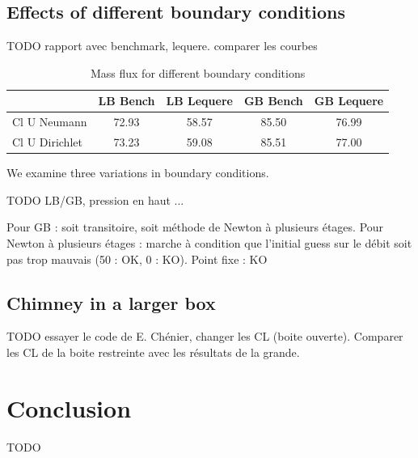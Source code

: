 \documentclass[12pt]{article}
\begin{document}
\subsection{Effects of different boundary conditions}
TODO rapport avec benchmark, lequere. comparer les courbes
\begin{table}[!h]
  \centering
  \begin{tabular}{|l|c|c|c|c|}
    \hline
    & LB Bench & LB Lequere & GB Bench & GB Lequere \\
    \hline
    Cl U Neumann & 72.93 & 58.57 & 85.50 & 76.99\\
    Cl U Dirichlet & 73.23 & 59.08 & 85.51 & 77.00 \\
    \hline
  \end{tabular}
  \caption{Mass flux for different boundary conditions}
\end{table}

We examine three variations in boundary conditions.

TODO LB/GB, pression en haut ...

Pour GB : soit transitoire, soit méthode de Newton à plusieurs
étages. Pour Newton à plusieurs étages : marche à condition que
l'initial guess sur le débit soit pas trop mauvais (50 : OK, 0 :
KO). Point fixe : KO

\subsection{Chimney in a larger box}
TODO essayer le code de E. Chénier, changer les CL (boite
ouverte). Comparer les CL de la boite restreinte avec les résultats de
la grande.
\section{Conclusion}
TODO
\listoffigures
\listoftables




\end{document}
